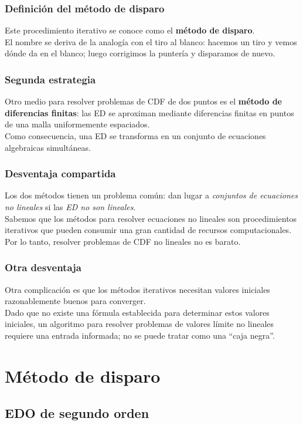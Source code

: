 \documentclass[12pt]{beamer}
\begin{document}
\begin{frame}
\frametitle{Definición del método de disparo}
Este procedimiento iterativo se conoce como el \textbf{\textcolor{brickred}{método de disparo}}.
\\
\bigskip
\pause
El nombre se deriva de la analogía con el tiro al blanco: \pause hacemos un tiro y vemos dónde da en el blanco; luego corrigimos la puntería y disparamos de nuevo.
\end{frame}
\begin{frame}
\frametitle{Segunda estrategia}
Otro medio para resolver problemas de CDF de dos puntos es el \textbf{\textcolor{chamoisee}{método de diferencias finitas}}: \pause  las ED se aproximan mediante diferencias finitas en puntos de una malla uniformemente espaciados.
\\
\bigskip
\pause
Como consecuencia, una ED se transforma en un conjunto de ecuaciones algebraicas simultáneas.
\end{frame}
\begin{frame}
\frametitle{Desventaja compartida}
Los dos métodos tienen un problema común: dan lugar a \emph{conjuntos de ecuaciones no lineales} si \pause las \emph{ED no son lineales}.
\\
\bigskip
\pause
Sabemos que los métodos para resolver ecuaciones no lineales son procedimientos iterativos que pueden consumir una gran cantidad de recursos computacionales. \pause Por lo tanto, resolver problemas de CDF no lineales no es barato.
\end{frame}
\begin{frame}
\frametitle{Otra desventaja}
Otra complicación es que los métodos iterativos necesitan valores iniciales razonablemente buenos para converger.
\\
\bigskip
\pause
Dado que no existe una fórmula establecida para determinar estos valores iniciales, un algoritmo para resolver problemas de valores límite no lineales requiere una entrada informada; no se puede tratar como una \enquote{caja negra}.
\end{frame}

\section{Método de disparo}
\subsection{EDO de segundo orden}
\end{document}
